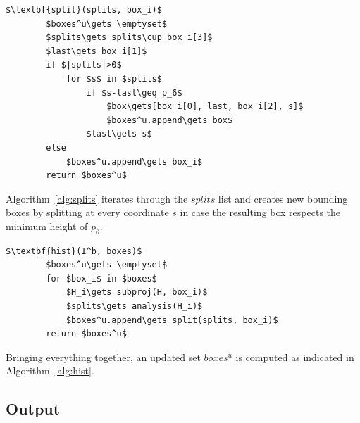 \documentclass{jdmdh}
\begin{document}
\begin{listing} [H]
  \begin{lstlisting}[mathescape]
    $\textbf{split}(splits, box_i)$
        $boxes^u\gets \emptyset$
        $splits\gets splits\cup box_i[3]$
        $last\gets box_i[1]$
        if $|splits|>0$
            for $s$ in $splits$
                if $s-last\geq p_6$
                    $box\gets[box_i[0], last, box_i[2], s]$
                    $boxes^u.append\gets box$
                $last\gets s$
        else
            $boxes^u.append\gets box_i$
        return $boxes^u$
    \end{lstlisting}
\caption{Potentially splits $box_i$ into multiple boxes using the $splits$ coordinates.}
\label{alg:splits}
\end{listing}
\noindent Algorithm~\ref{alg:splits} iterates through the $splits$ list and creates new bounding boxes by splitting at every coordinate $s$ in case the resulting box respects the minimum height of $p_6$.
\begin{listing} [H]
  \begin{lstlisting}[mathescape]
    $\textbf{hist}(I^b, boxes)$
        $boxes^u\gets \emptyset$
        for $box_i$ in $boxes$
            $H_i\gets subproj(H, box_i)$
            $splits\gets analysis(H_i)$
            $boxes^u.append\gets split(splits, box_i)$
        return $boxes^u$
    \end{lstlisting}
\caption{Transforms initial $boxes$ into updated $boxes^u$ using histogram information of $I^b$.}
\label{alg:hist}
\end{listing}
\noindent Bringing everything together, an updated set $boxes^u$ is computed as indicated in Algorithm~\ref{alg:hist}.
\subsection{Output}
\end{document}
